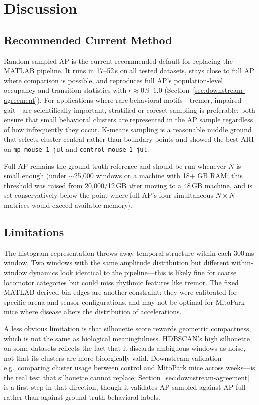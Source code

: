 \documentclass[11pt]{article}
\begin{document}
\FloatBarrier
\section{Discussion}

\subsection{Recommended Current Method}

Random-sampled AP is the current recommended default for replacing the MATLAB pipeline. It runs in 17--52\,s on all tested datasets, stays close to full AP where comparison is possible, and reproduces full AP's population-level occupancy and transition statistics with $r \approx 0.9$--$1.0$ (Section~\ref{sec:downstream-agreement}). For applications where rare behavioral motifs---tremor, impaired gait---are scientifically important, stratified or coreset sampling is preferable: both ensure that small behavioral clusters are represented in the AP sample regardless of how infrequently they occur. K-means sampling is a reasonable middle ground that selects cluster-central rather than boundary points and showed the best ARI on \texttt{mp\_mouse\_1\_jul} and \texttt{control\_mouse\_1\_jul}.

Full AP remains the ground-truth reference and should be run whenever $N$ is small enough (under $\sim$25,000 windows on a machine with 18+ GB RAM; this threshold was raised from 20,000/12\,GB after moving to a 48\,GB machine, and is set conservatively below the point where full AP's four simultaneous $N \times N$ matrices would exceed available memory).

\subsection{Limitations}
\label{sec:limitations}

The histogram representation throws away temporal structure within each 300\,ms window. Two windows with the same amplitude distribution but different within-window dynamics look identical to the pipeline---this is likely fine for coarse locomotor categories but could miss rhythmic features like tremor. The fixed MATLAB-derived bin edges are another constraint: they were calibrated for specific arena and sensor configurations, and may not be optimal for MitoPark mice where disease alters the distribution of accelerations.

A less obvious limitation is that silhouette score rewards geometric compactness, which is not the same as biological meaningfulness. HDBSCAN's high silhouette on some datasets reflects the fact that it discards ambiguous windows as noise, not that its clusters are more biologically valid. Downstream validation---e.g.\ comparing cluster usage between control and MitoPark mice across weeks---is the real test that silhouette cannot replace; Section~\ref{sec:downstream-agreement} is a first step in that direction, though it validates AP sampled against AP full rather than against ground-truth behavioral labels.
\end{document}
